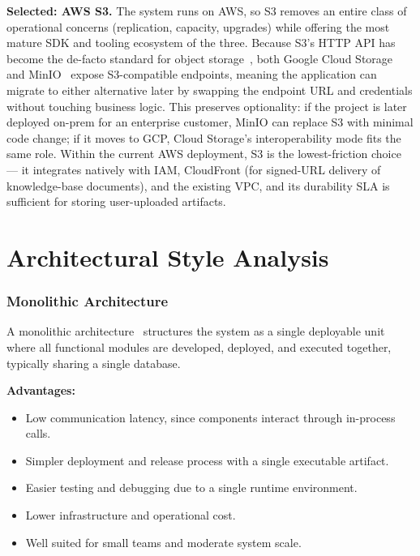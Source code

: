 \documentclass[a4paper]{article}
\begin{document}
\textbf{Selected: AWS S3.} The system runs on AWS, so S3 removes
an entire class of operational concerns (replication, capacity,
upgrades) while offering the most mature SDK and tooling ecosystem
of the three. Because S3's HTTP API has become the de-facto
standard for object storage~\cite{aws_s3_docs}, both Google Cloud
Storage~\cite{gcloud_storage} and MinIO~\cite{minio_docs} expose
S3-compatible endpoints, meaning the application can migrate to
either alternative later by swapping the endpoint URL and
credentials without touching business logic. This preserves
optionality: if the project is later deployed on-prem for an
enterprise customer, MinIO can replace S3 with minimal code
change; if it moves to GCP, Cloud Storage's interoperability mode
fits the same role. Within the current AWS deployment, S3 is the
lowest-friction choice --- it integrates natively with IAM,
CloudFront (for signed-URL delivery of knowledge-base documents),
and the existing VPC, and its durability SLA is
sufficient for storing user-uploaded artifacts.




\newpage
\section{Architectural Style Analysis}
\label{appendix:arch-style}

\subsubsection{Monolithic Architecture}

A monolithic architecture~\cite{richards2020fundamentals} structures 
the system as a single deployable unit where all functional modules 
are developed, deployed, and executed together, typically sharing a 
single database.

\textbf{Advantages:}
\begin{itemize}
    \item Low communication latency, since components interact 
    through in-process calls.
    \item Simpler deployment and release process with a single 
    executable artifact.
    \item Easier testing and debugging due to a single runtime 
    environment.
    \item Lower infrastructure and operational cost.
    \item Well suited for small teams and moderate system scale.
\end{itemize}
\end{document}
